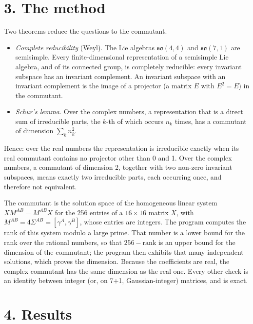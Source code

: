\documentclass[
  10pt,
]{article}
\providecommand{\tightlist}{%
  \setlength{\itemsep}{0pt}\setlength{\parskip}{0pt}}
\begin{document}
\hypertarget{the-method}{%
\section{3. The method}\label{the-method}}

Two theorems reduce the questions to the commutant.

\begin{itemize}
\tightlist
\item
  \emph{Complete reducibility} (Weyl). The Lie algebras
  \(\mathfrak{so}(4,4)\) and \(\mathfrak{so}(7,1)\) are semisimple.
  Every finite-dimensional representation of a semisimple Lie algebra,
  and of its connected group, is completely reducible: every invariant
  subspace has an invariant complement. An invariant subspace with an
  invariant complement is the image of a projector (a matrix \(E\) with
  \(E^2=E\)) in the commutant.
\item
  \emph{Schur's lemma.} Over the complex numbers, a representation that
  is a direct sum of irreducible parts, the \(k\)-th of which occurs
  \(n_k\) times, has a commutant of dimension \(\sum_kn_k^2\).
\end{itemize}

Hence: over the real numbers the representation is irreducible exactly
when its real commutant contains no projector other than 0 and 1. Over
the complex numbers, a commutant of dimension 2, together with two
non-zero invariant subspaces, means exactly two irreducible parts, each
occurring once, and therefore not equivalent.

The commutant is the solution space of the homogeneous linear system
\(XM^{AB}=M^{AB}X\) for the 256 entries of a \(16\times16\) matrix
\(X\), with \(M^{AB}=4\Sigma^{AB}=[\gamma^A,\gamma^B]\), whose entries
are integers. The program computes the rank of this system modulo a
large prime. That number is a lower bound for the rank over the rational
numbers, so that \(256-\text{rank}\) is an upper bound for the dimension
of the commutant; the program then exhibits that many independent
solutions, which proves the dimension. Because the coefficients are
real, the complex commutant has the same dimension as the real one.
Every other check is an identity between integer (or, on 7+1,
Gaussian-integer) matrices, and is exact.

\hypertarget{results}{%
\section{4. Results}\label{results}}
\end{document}
